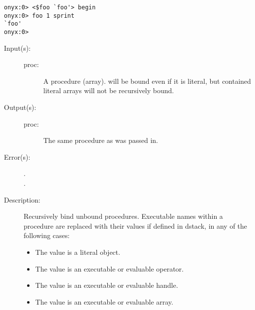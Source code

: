 \begin{description}
\begin{description}
\begin{verbatim}
onyx:0> <$foo `foo'> begin
onyx:0> foo 1 sprint
`foo'
onyx:0>
		\end{verbatim}
	\end{description}
\label{systemdict:bind}
\item[{\onyxop{proc}{bind}{proc}}: ]
	\begin{description}\item[]
	\item[Input(s): ]
		\begin{description}\item[]
		\item[proc: ]
			A procedure (array).   will be bound even if
			it is literal, but contained literal arrays will not be
			recursively bound.
		\end{description}
	\item[Output(s): ]
		\begin{description}\item[]
		\item[proc: ]
			The same procedure as was passed in.
		\end{description}
	\item[Error(s): ]
		\begin{description}\item[]
		\item[.]
		\item[.]
		\end{description}
	\item[Description: ]
		Recursively bind unbound procedures.  Executable names within a
		procedure are replaced with their values if defined in dstack,
		in any of the following cases:
		\begin{itemize}
		\item{The value is a literal object.}
		\item{The value is an executable or evaluable operator.}
		\item{The value is an executable or evaluable handle.}
		\item{The value is an executable or evaluable array.}
		\end{itemize}


\end{description}
\end{description}
